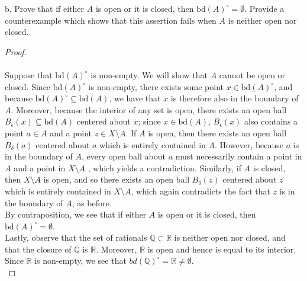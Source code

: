 \pagebreak

b. Prove that if either $A$ is open or it is closed, then $\text{bd}(A)^{\circ} = \emptyset$. Provide a counterexample
   which shows that this assertion fails when $A$ is neither open nor closed. \ \\
    
\begin{proof}\ \\\\
    Suppose that $\text{bd}(A)^{\circ}$ is non-empty. We will show that $A$ cannot be open or closed. Since 
    $\text{bd}(A)^{\circ}$ is non-empty, there exists some point $x \in \text{bd}(A)^{\circ}$, and because 
    $\text{bd}(A)^{\circ} \subseteq \text{bd}(A)$, we have that $x$ is therefore also in the boundary of $A$. Moreover, 
    because the interior of any set is open, there exists an open ball $B_{\epsilon}(x) \subseteq \text{bd}(A)$ centered
    about $x$; since $x \in \text{bd}(A)$, $B_{\epsilon}(x)$ also contains a point $a \in A$ and a point 
    $z \in X \setminus A$. If $A$ is open, then there exists an open ball $B_{\delta}(a)$ centered about $a$ which is 
    entirely contained in $A$. However, because $a$ is in the boundary of $A$, every open ball about $a$ must 
    necessarily contain a point in $A$ and a point in $X \setminus A$ , which yields a contradiction. Similarly, if $A$ 
    is closed, then $X \setminus A$ is open, and so there exists an open ball $B_{\delta}(z)$ centered about $z$ which 
    is entirely contained in $X \setminus A$, which again contradicts the fact that $z$ is in the boundary of $A$, as 
    before. \\

    By contraposition, we see that if either $A$ is open or it is closed, then $\text{bd}(A)^{\circ} = \emptyset$. \\

    Lastly, observe that the set of rationals $\mathbb{Q} \subset \mathbb{R}$ is neither open nor closed, and that the
    closure of $\mathbb{Q}$ is $\mathbb{R}$. Moreover, $\mathbb{R}$ is open and hence is equal to its interior. Since
    $\mathbb{R}$ is non-empty, we see that $bd(\mathbb{Q})^{\circ} = \mathbb{R} \neq \emptyset$.
    \ \\
\end{proof}

\pagebreak